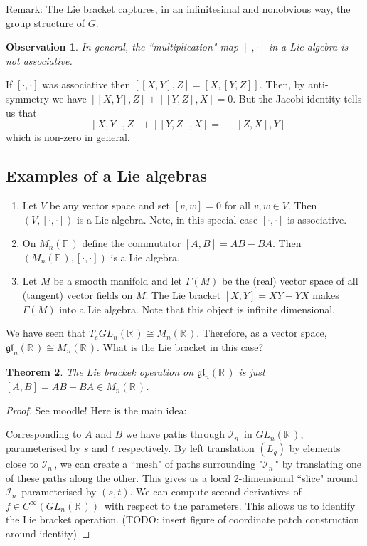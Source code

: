 \documentclass[12pt,a4paper]{article}
\newcommand{\rR}{\ensuremath{\mathbb{R}\,}}
\newcommand{\fF}{\ensuremath{\mathbb{F}\,}}
\newcommand{\cinfn}[1]{\ensuremath{C^{\infty}(#1)\,}}
\newcommand{\cin}{\ensuremath{\mathcal{I}_n\,}}
\newcommand{\ul}[1]{\underline{#1}}
\newtheorem{thm}{Theorem}[subsubsection]
\newtheorem{obs}[thm]{Observation}
\begin{document}
\ul{Remark:} The Lie bracket captures, in an infinitesimal and nonobvious way, the group structure of $G$.

\begin{obs}
In general, the ``multiplication" map $[\cdot ,\cdot]$ in a Lie algebra is not associative.
\end{obs}

If $[\cdot ,\cdot]$ was associative then $[[X, Y], Z] = [X, [Y, Z]]$. Then, by anti-symmetry we have $[[X, Y], Z] + [[Y, Z], X] = 0$. But the Jacobi identity tells us that
\[ [[X, Y], Z] + [[Y, Z], X] = -[[Z, X], Y] \]
which is non-zero in general.

\subsection*{Examples of a Lie algebras}

\begin{enumerate}
\item Let $V$ be any vector space and set $[v, w] = 0$ for all $v, w \in V$. Then $(V, [\cdot, \cdot])$ is a Lie algebra. Note, in this special case $[\cdot, \cdot]$ is associative.

\item On $M_n(\fF)$ define the commutator $[A, B] = AB - BA$. Then $(M_n(\fF), [\cdot, \cdot])$ is a Lie algebra.

\item Let $M$ be a smooth manifold and let $\Gamma (M)$ be the (real) vector space of all (tangent) vector fields on $M$. The Lie bracket $[X, Y] = XY - YX$ makes $\Gamma (M)$ into a Lie algebra. Note that this object is infinite dimensional.
\end{enumerate}

We have seen that $T_eGL_n(\rR) \cong M_n(\rR)$. Therefore, as a vector space, $\mathfrak{gl}_n(\rR) \cong M_n(\rR)$. What is the Lie bracket in this case?

\begin{thm}
The Lie brackek operation on $\mathfrak{gl}_n(\rR)$ is just $[A, B] = AB - BA \in M_n(\rR)$.
\end{thm}

\begin{proof}
See moodle! Here is the main idea:

Corresponding to $A$ and $B$ we have paths through $\cin$ in $GL_n(\rR)$, parameterised by $s$ and $t$ respectively. By left translation $(L_g)$ by elements close to $\cin$, we can create a ``mesh" of paths surrounding "\cin" by translating one of these paths along the other. This gives us a local 2-dimensional ``slice" around $\cin$ parameterised by $(s, t)$. We can compute second derivatives of $f\in \cinfn{GL_n(\rR)}$ with respect to the parameters. This allows us to identify the Lie bracket operation. (TODO: insert figure of coordinate patch construction around identity)
\end{proof}
\end{document}

